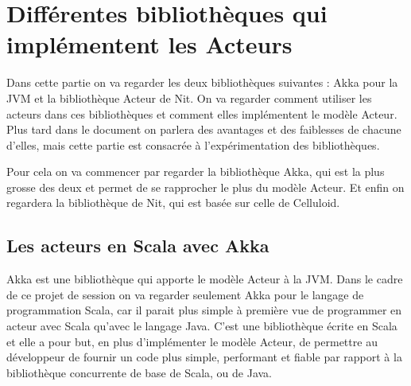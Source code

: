 \documentclass[11pt, a4paper]{article}
\begin{document}
\section{Différentes bibliothèques qui implémentent les Acteurs}
Dans cette partie on va regarder les deux bibliothèques suivantes : Akka pour la JVM et la bibliothèque Acteur de Nit. On va regarder comment utiliser les acteurs dans ces bibliothèques et comment elles implémentent le modèle Acteur. Plus tard dans le document on parlera des avantages et des faiblesses de chacune d'elles, mais cette partie est consacrée à l'expérimentation des bibliothèques. 
\par Pour cela on va commencer par regarder la bibliothèque Akka, qui est la plus grosse des deux et permet de se rapprocher le plus du modèle Acteur. Et enfin on regardera la bibliothèque de Nit, qui est basée sur celle de Celluloid.

\subsection{Les acteurs en Scala avec Akka}
Akka est une bibliothèque qui apporte le modèle Acteur à la JVM. Dans le cadre de ce projet de session on va regarder seulement Akka pour le langage de programmation Scala, car il parait plus simple à première vue de programmer en acteur avec Scala qu'avec le langage Java. C'est une bibliothèque écrite en Scala et elle a pour but, en plus d'implémenter le modèle Acteur, de permettre au développeur de fournir un code plus simple, performant et fiable par rapport à la bibliothèque concurrente de base de Scala, ou de Java.
\end{document}
